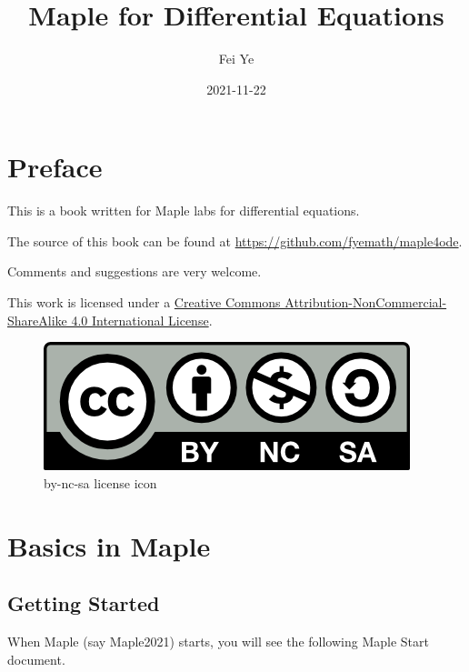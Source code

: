 \documentclass[
  12pt]{elegantbook}
\institute{QCC-CUNY}
\title{Maple for Differential Equations}
\author{Fei Ye}
\date{2021-11-22}
\begin{document}
\maketitle

{
\setcounter{tocdepth}{0}
\tableofcontents
}
\mainmatter

\hypersetup{pageanchor=true}

\captionsetup[figure]{labelformat=empty}
\captionsetup[subfigure]{labelformat=empty}

\hypertarget{preface}{%
\chapter*{Preface}\label{preface}}

This is a book written for Maple labs for differential equations.

The source of this book can be found at \url{https://github.com/fyemath/maple4ode}.

Comments and suggestions are very welcome.

This work is licensed under a \href{https://creativecommons.org/licenses/by-nc-sa/4.0/}{Creative Commons Attribution-NonCommercial-ShareAlike 4.0 International License}.

\begin{figure}
\centering
\includegraphics{figs/by-nc-sa.png}
\caption{by-nc-sa license icon}
\end{figure}

\hypertarget{basics-in-maple}{%
\chapter{Basics in Maple}\label{basics-in-maple}}

\hypertarget{getting-started}{%
\section{Getting Started}\label{getting-started}}

When Maple (say Maple2021) starts, you will see the following Maple Start document.
\end{document}
